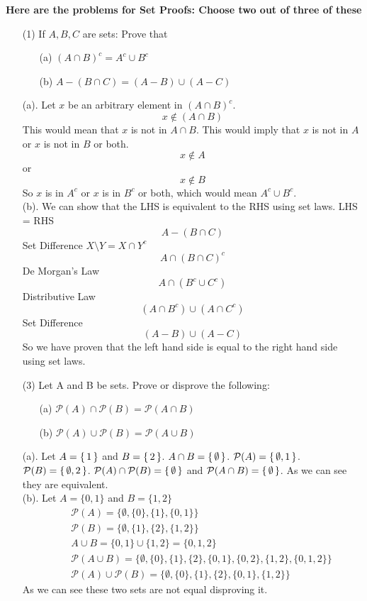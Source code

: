 \documentclass[answers,12pt]{exam}
\newcommand{\br}{\hfill \break}
\newcommand{\bs}{\begin{solution}}
\newcommand{\es}{\end{solution}}
\begin{document}
\br
\textbf{Here are the problems for Set Proofs: Choose two out of three of these}
\begin{enumerate}
    \item [(1)] If \(A,B, C\) are sets: Prove that \begin{enumerate}
        \item [(a)] \((A \cap B)^c = A^c \cup B^c\)
        \item [(b)] \(A - (B \cap C)= (A-B) \cup (A-C)\)
    \end{enumerate}
    \bs
    (a). Let \(x\) be an arbitrary element in \((A \cap B)^c\). \[x \notin (A \cap B)\] This would mean that \(x\) is not in \(A \cap B\). This would imply that \(x\) is not in \(A\) or \(x\) is not in \(B\) or both. \[x \notin A\] or \[x \notin B\] So \(x\) is in \(A^c\) or \(x\) is in \(B^c\) or both, which would mean \(A^c \cup B^c\).\\
    (b). We can show that the LHS is equivalent to the RHS using set laws. LHS = RHS\\
    \[A - (B \cap C)\]
    Set Difference \(X \setminus Y = X \cap Y^c\)
    \[A \cap (B \cap C)^c\]
    De Morgan's Law
    \[A \cap (B^c \cup C^c)\]
    Distributive Law
    \[(A \cap B^c) \cup (A \cap C^c)\]
    Set Difference
    \[(A - B) \cup (A - C)\]
    So we have proven that the left hand side is equal to the right hand side using set laws.
    \es
    \item [(3)] Let A and B be sets. Prove or disprove the following: \begin{enumerate}
        \item [(a)] \(\mathcal{P}(A) \cap \mathcal{P}(B) = \mathcal{P}(A \cap B)\)
        \item [(b)]\(\mathcal{P}(A) \cup \mathcal{P}(B) = \mathcal{P}(A \cup B)\)
    \end{enumerate}
    \bs
    (a). Let \(A = \set{1}\) and \(B = \set{2}\). \(A \cap B = \set{\emptyset}\). \(\mathcal{P}(A) = \set{{\emptyset},{1}}\).  \(\mathcal{P}(B) = \set{{\emptyset},{2}}\). \(\mathcal{P}(A) \cap \mathcal{P}(B) = \set{\emptyset}\) and \(\mathcal{P}(A \cap B) = \set{\emptyset}\). As we can see they are equivalent.\\
    (b). Let $A = \{0, 1\}$ and $B = \{1, 2\}$
    \begin{align*}
\quad & \mathcal{P}(A) = \{\emptyset, \{0\}, \{1\}, \{0, 1\}\} \\
 \quad & \mathcal{P}(B) = \{\emptyset, \{1\}, \{2\}, \{1, 2\}\} \\
  \quad & A \cup B = \{0, 1\} \cup \{1, 2\} = \{0, 1, 2\} \\
\quad & \mathcal{P}(A \cup B) = \{\emptyset, \{0\}, \{1\}, \{2\}, \{0, 1\}, \{0, 2\}, \{1, 2\}, \{0, 1, 2\}\} \\
\quad & \mathcal{P}(A) \cup \mathcal{P}(B) = \{\emptyset, \{0\}, \{1\}, \{2\}, \{0, 1\}, \{1, 2\}\}
\end{align*}
As we can see these two sets are not equal disproving it.
    \es
\end{enumerate}
\end{document}
